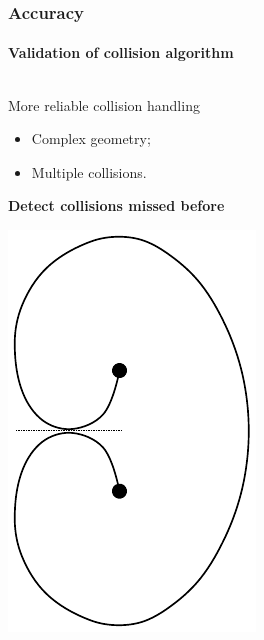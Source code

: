 \documentclass[aspectratio=1610,t,10pt]{beamer}
\begin{document}
\begin{frame}
\frametitle{Accuracy}
\framesubtitle{Validation of collision algorithm}
\vspace*{-1em}
\begin{columns}[t]
	\begin{column}{.48\textwidth}
		\begin{block}{More reliable collision handling}
			\begin{itemize}
				\item Complex geometry;
				\item Multiple collisions.
			\end{itemize}
			\centering
			\textbf{Detect collisions missed before}
		\end{block}
		\centering
		\begin{minipage}{0.30\linewidth}
			\includegraphics[width=\linewidth]{img/frankread}

\end{minipage}
\end{column}
\end{columns}
\end{frame}
\end{document}

